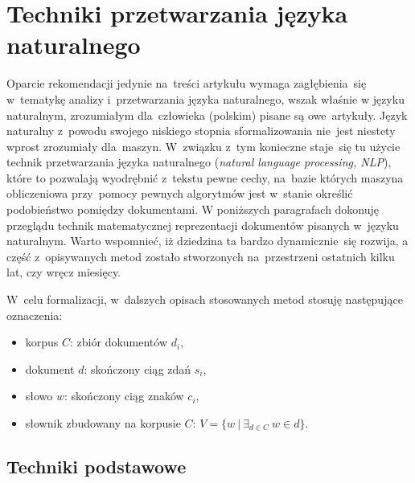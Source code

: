 \documentclass[pl]{minipw} %
\begin{document}
\section{Techniki przetwarzania języka naturalnego}
Oparcie rekomendacji jedynie na~treści artykułu wymaga zagłębienia~się w~tematykę analizy i~przetwarzania języka naturalnego, wszak właśnie w języku naturalnym, zrozumiałym dla~człowieka (polskim) pisane są owe~artykuły. Język naturalny z~powodu swojego niskiego stopnia sformalizowania nie~jest niestety wprost zrozumiały dla~maszyn. W~związku z~tym konieczne staje~się tu użycie technik przetwarzania języka naturalnego (\textit{natural language processing, NLP}), które to pozwalają wyodrębnić z~tekstu pewne cechy, na~bazie których maszyna obliczeniowa przy~pomocy pewnych algorytmów jest w~stanie określić podobieństwo pomiędzy dokumentami. W poniższych paragrafach dokonuję przeglądu technik matematycznej reprezentacji dokumentów pisanych w~języku naturalnym. Warto wspomnieć, iż dziedzina ta bardzo dynamicznie~się rozwija, a część z~opisywanych metod zostało stworzonych na~przestrzeni ostatnich kilku lat, czy wręcz miesięcy.

W~celu formalizacji, w~dalszych opisach stosowanych metod stosuję następujące oznaczenia:
\begin{itemize}
	\item korpus $C$: zbiór dokumentów $d_i$,
	\item dokument $d$: skończony ciąg zdań $s_i$,
	\item słowo $w$: skończony ciąg znaków $c_i$,
	\item słownik zbudowany na korpusie $C$: $V = \{w\ |\ \exists_{d \in C}\ w \in d\}$.
\end{itemize}

\subsection{Techniki podstawowe}
\end{document}
